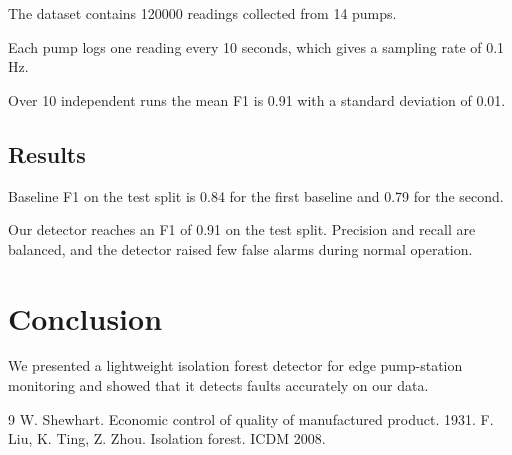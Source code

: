 \documentclass{article}
\begin{document}
The dataset contains 120000 readings collected from 14 pumps.

Each pump logs one reading every 10 seconds, which gives a sampling rate of 0.1 Hz.

Over 10 independent runs the mean F1 is 0.91 with a standard deviation of 0.01.

\subsection{Results}
Baseline F1 on the test split is 0.84 for the first baseline and 0.79 for the second.

Our detector reaches an F1 of 0.91 on the test split. Precision and recall are balanced, and the detector raised few false alarms during normal operation.

\section{Conclusion}
We presented a lightweight isolation forest detector for edge pump-station monitoring and showed that it detects faults accurately on our data.

\begin{thebibliography}{9}
 W. Shewhart. Economic control of quality of manufactured product. 1931.
 F. Liu, K. Ting, Z. Zhou. Isolation forest. ICDM 2008.
\end{thebibliography}
\end{document}
